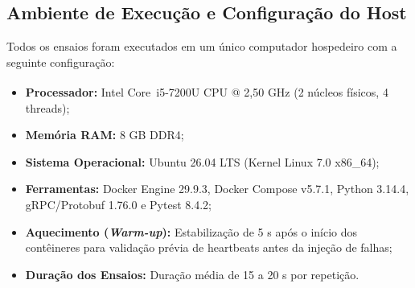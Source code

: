 \subsection{Ambiente de Execução e Configuração do Host}
Todos os ensaios foram executados em um único computador hospedeiro com a seguinte configuração:
\begin{itemize}
    \item \textbf{Processador:} Intel\textsuperscript{\textregistered} Core\texttrademark\ i5-7200U CPU @ 2,50 GHz (2 núcleos físicos, 4 threads);
    \item \textbf{Memória RAM:} 8 GB DDR4;
    \item \textbf{Sistema Operacional:} Ubuntu 26.04 LTS (Kernel Linux 7.0 x86\_64);
    \item \textbf{Ferramentas:} Docker Engine 29.9.3, Docker Compose v5.7.1, Python 3.14.4, gRPC/Protobuf 1.76.0 e Pytest 8.4.2;
    \item \textbf{Aquecimento (\textit{Warm-up}):} Estabilização de 5 s após o início dos contêineres para validação prévia de heartbeats antes da injeção de falhas;
    \item \textbf{Duração dos Ensaios:} Duração média de 15 a 20 s por repetição.
\end{itemize}
